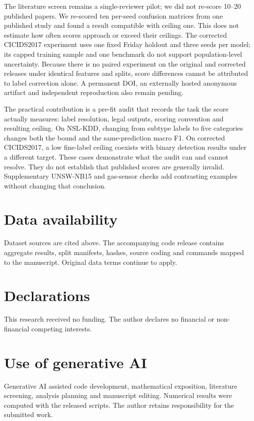 \documentclass[journal]{IEEEtran}
\begin{document}
The literature screen remains a single-reviewer pilot; we did not re-score 10--20 published papers. We re-scored ten per-seed confusion matrices from one published study and found a result compatible with ceiling one. This does not estimate how often scores approach or exceed their ceilings. The corrected CICIDS2017 experiment uses one fixed Friday holdout and three seeds per model; its capped training sample and one benchmark do not support population-level uncertainty. Because there is no paired experiment on the original and corrected releases under identical features and splits, score differences cannot be attributed to label correction alone. A permanent DOI, an externally hosted anonymous artifact and independent reproduction also remain pending.

The practical contribution is a pre-fit audit that records the task the score actually measures: label resolution, legal outputs, scoring convention and resulting ceiling. On NSL-KDD, changing from subtype labels to five categories changes both the bound and the same-prediction macro F1. On corrected CICIDS2017, a low fine-label ceiling coexists with binary detection results under a different target. These cases demonstrate what the audit can and cannot resolve. They do not establish that published scores are generally invalid. Supplementary UNSW-NB15 and gas-sensor checks add contrasting examples without changing that conclusion.

\section*{Data availability}
Dataset sources are cited above. The accompanying code release contains aggregate results, split manifests, hashes, source coding and commands mapped to the manuscript. Original data terms continue to apply.
\section*{Declarations}
This research received no funding. The author declares no financial or non-financial competing interests.
\section*{Use of generative AI}
Generative AI assisted code development, mathematical exposition, literature screening, analysis planning and manuscript editing. Numerical results were computed with the released scripts. The author retains responsibility for the submitted work.


\end{document}
